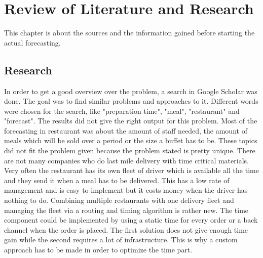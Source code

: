 \chapter{Review of Literature and Research}\label{chapter:Review of Literature and Research}
This chapter is about the sources and the information gained before starting the actual forecasting.
\section{Research}\label{section:Research}
In order to get a good overview over the problem, a search in Google Scholar was done. The goal was to find similar problems and approaches to it. Different words were chosen for the search, like "preparation time", "meal", "restaurant" and "forecast". The results did not give the right output for this problem. Most of the forecasting in restaurant was about the amount of staff needed, the amount of meals which will be sold over a period or the size a buffet has to
be. These topics did not fit the problem given because the problem stated is pretty unique. There are not many companies who do last mile delivery with time critical materials. Very often the restaurant has its own fleet of driver which is available all the time and they send it when a meal has to be delivered. This has a low rate of management and is easy to implement but it costs money when the driver has nothing to do. Combining multiple restaurants with one delivery fleet and managing the fleet via a routing and timing algorithm is rather new. The time component could be implemented by using a static time for every order or a back channel when the order is placed. The first solution does not give enough time gain while the second requires a lot of infrastructure. This is why a custom approach has to be made in order to optimize the time part.
